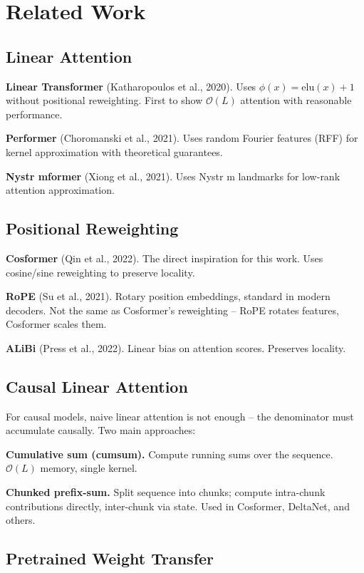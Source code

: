 
\section{Related Work}

\subsection{Linear Attention}

\textbf{Linear Transformer} (Katharopoulos et al., 2020). Uses $\phi(x) = \text{elu}(x) + 1$ 
without positional reweighting. First to show $\mathcal{O}(L)$ attention 
with reasonable performance.

\textbf{Performer} (Choromanski et al., 2021). Uses random Fourier features 
(RFF) for kernel approximation with theoretical guarantees.

\textbf{Nystr mformer} (Xiong et al., 2021). Uses Nystr m landmarks for low-rank 
attention approximation.

\subsection{Positional Reweighting}

\textbf{Cosformer} (Qin et al., 2022). The direct inspiration for this work. 
Uses cosine/sine reweighting to preserve locality.

\textbf{RoPE} (Su et al., 2021). Rotary position embeddings, standard in modern 
decoders. Not the same as Cosformer's reweighting -- RoPE rotates features, 
Cosformer scales them.

\textbf{ALiBi} (Press et al., 2022). Linear bias on attention scores. Preserves 
locality.

\subsection{Causal Linear Attention}

For causal models, naive linear attention is not enough -- the denominator 
must accumulate causally. Two main approaches:

\textbf{Cumulative sum (cumsum).} Compute running sums over the sequence. 
$\mathcal{O}(L)$ memory, single kernel.

\textbf{Chunked prefix-sum.} Split sequence into chunks; compute intra-chunk 
contributions directly, inter-chunk via state. Used in Cosformer, DeltaNet, 
and others.

\subsection{Pretrained Weight Transfer}

